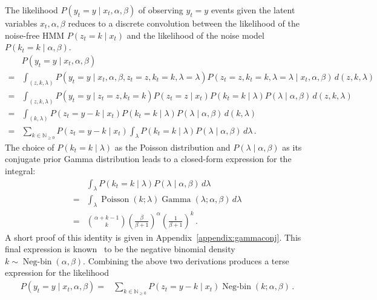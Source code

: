 \documentclass[twoside, 11pt]{article}
\DeclareMathOperator*{\gammad}{Gamma}
\DeclareMathOperator*{\poissond}{Poisson}
\DeclareMathOperator*{\negbind}{Neg-bin}
\newcommand{\nonnegint}[0] {\mathbb{N}_{\geq 0}}
\begin{document}
The likelihood $P(y_t=y \mid x_t, \alpha, \beta)$ of observing $y_t=y$ events given the latent variables $x_t, \alpha, \beta$ reduces to a discrete convolution between the likelihood of the noise-free HMM $P(z_t=k \mid x_t)$ and the likelihood of the noise model $P(k_t=k \mid \alpha, \beta)$.
\begin{align}
& P(y_t=y \mid x_t, \alpha, \beta) \nonumber \\
= & \int_{(z, k, \lambda)} P(y_t=y \mid x_t, \alpha, \beta, z_t=z, k_t=k, \lambda=\lambda) P(z_t=z, k_t=k, \lambda=\lambda \mid x_t, \alpha, \beta) \, d(z, k, \lambda) \nonumber \\
= & \int_{(z, k, \lambda)}
P(y_t=y \mid z_t=z, k_t=k)
P(z_t=z \mid x_t)
P(k_t=k \mid \lambda)
P(\lambda \mid \alpha, \beta)
\, d(z, k, \lambda) \nonumber \\
= & \int_{(k, \lambda)}
P(z_t=y-k \mid x_t)
P(k_t=k \mid \lambda)
P(\lambda \mid \alpha, \beta)
\, d(k, \lambda) \nonumber \\
= & \sum_{k \in \nonnegint} P(z_t = y-k \mid x_t)
\int_{\lambda} P(k_t = k \mid \lambda) P(\lambda \mid \alpha, \beta) \, d \lambda \, .
\end{align}
The choice of $P(k_t = k \mid \lambda)$ as the Poisson distribution and $P(\lambda \mid \alpha, \beta)$ as its conjugate prior Gamma distribution leads to a closed-form expression for the integral:
\begin{align}
& \int_{\lambda}
P(k_t = k \mid \lambda) P(\lambda \mid \alpha, \beta)
\, d \lambda \nonumber \\
= & \int_{\lambda}
\poissond( k ; \lambda) \gammad( \lambda ; \alpha, \beta)
\, d \lambda \nonumber \\
= &
\binom{\alpha+k-1}{k} \left( \frac{\beta}{\beta+1} \right)^{\alpha} \left( \frac{1}{\beta+1} \right)^{k} \, .
\end{align}
A short proof of this identity is given in Appendix~\ref{appendix:gammaconj}. This final expression is known~\citep{gelman2013bayesian} to be the negative binomial density $k \sim \negbind\left(\alpha, \beta\right)$. Combining the above two derivations produces a terse expression for the likelihood
\begin{align}
P(y_t=y \mid x_t, \alpha, \beta)
= & \sum_{k \in \nonnegint} P(z_t = y-k \mid x_t) \negbind\left(k ; \alpha, \beta\right) \, . \label{eqn:hybridconjpriorobs}
\end{align}

\end{document}
